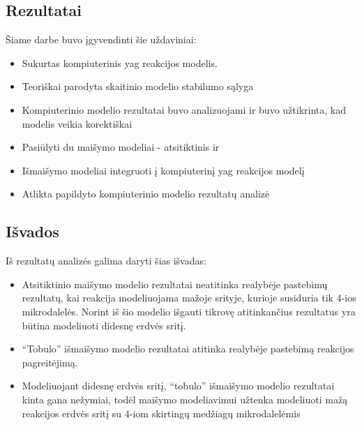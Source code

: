 
\subsection*{Rezultatai}

Šiame darbe buvo įgyvendinti šie uždaviniai:

\begin{itemize}
    \item Sukurtas kompiuterinis \acs{yag} reakcijos modelis. 
    \item Teoriškai parodyta skaitinio modelio stabilumo sąlyga
    \item Kompiuterinio modelio rezultatai buvo analizuojami ir buvo užtikrinta, kad modelis veikia korektiškai
    \item Pasiūlyti du maišymo modeliai - atsitiktinis ir 
    \item Išmaišymo modeliai integruoti į kompiuterinį \acs{yag} reakcijos modelį
    \item Atlikta papildyto kompiuterinio modelio rezultatų analizė
\end{itemize}

\subsection*{Išvados}

Iš rezultatų analizės galima daryti šias išvadas:

\begin{itemize}
    \item Atsitiktinio maišymo modelio rezultatai neatitinka realybėje pastebimų rezultatų, kai reakcija modeliuojama mažoje srityje, kurioje susiduria tik 4-ios mikrodalelės. Norint iš šio modelio išgauti tikrovę atitinkančius rezultatus yra būtina modeliuoti didesnę erdvės sritį.

    \item \enquote{Tobulo} išmaišymo modelio rezultatai atitinka realybėje pastebimą reakcijos pagreitėjimą.
    
    \item Modeliuojant didesnę erdvės sritį, \enquote{tobulo} išmaišymo modelio rezultatai kinta gana nežymiai, todėl maišymo modeliavimui užtenka modeliuoti mažą reakcijos erdvės sritį su 4-iom skirtingų medžiagų mikrodalelėmis

\end{itemize}